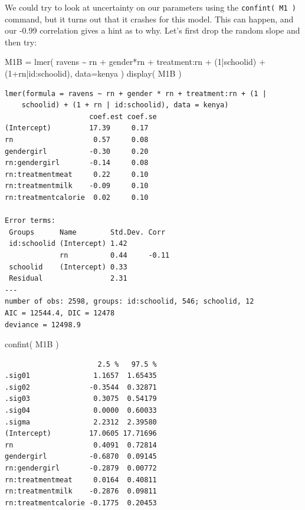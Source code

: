 \documentclass[
  letterpaper,
  DIV=11,
  numbers=noendperiod]{scrreprt}
\newenvironment{Shaded}{}{}
\newcommand{\AttributeTok}[1]{\textcolor[rgb]{0.49,0.56,0.16}{#1}}
\newcommand{\DecValTok}[1]{\textcolor[rgb]{0.25,0.63,0.44}{#1}}
\newcommand{\FunctionTok}[1]{\textcolor[rgb]{0.02,0.16,0.49}{#1}}
\newcommand{\NormalTok}[1]{#1}
\newcommand{\OtherTok}[1]{\textcolor[rgb]{0.00,0.44,0.13}{#1}}
\newcommand{\SpecialCharTok}[1]{\textcolor[rgb]{0.25,0.44,0.63}{#1}}
\begin{document}
We could try to look at uncertainty on our parameters using the
\texttt{confint(\ M1\ )} command, but it turns out that it crashes for
this model. This can happen, and our -0.99 correlation gives a hint as
to why. Let's first drop the random slope and then try:

\begin{Shaded}
\begin{Highlighting}[]
\NormalTok{M1B }\OtherTok{=} \FunctionTok{lmer}\NormalTok{( ravens }\SpecialCharTok{\textasciitilde{}}\NormalTok{ rn }\SpecialCharTok{+}\NormalTok{ gender}\SpecialCharTok{*}\NormalTok{rn }\SpecialCharTok{+}\NormalTok{ treatment}\SpecialCharTok{:}\NormalTok{rn }\SpecialCharTok{+}\NormalTok{ (}\DecValTok{1}\SpecialCharTok{|}\NormalTok{schoolid) }\SpecialCharTok{+}\NormalTok{ (}\DecValTok{1}\SpecialCharTok{+}\NormalTok{rn}\SpecialCharTok{|}\NormalTok{id}\SpecialCharTok{:}\NormalTok{schoolid), }
           \AttributeTok{data=}\NormalTok{kenya )}
\FunctionTok{display}\NormalTok{( M1B )}
\end{Highlighting}
\end{Shaded}

\begin{verbatim}
lmer(formula = ravens ~ rn + gender * rn + treatment:rn + (1 | 
    schoolid) + (1 + rn | id:schoolid), data = kenya)
                    coef.est coef.se
(Intercept)         17.39     0.17  
rn                   0.57     0.08  
gendergirl          -0.30     0.20  
rn:gendergirl       -0.14     0.08  
rn:treatmentmeat     0.22     0.10  
rn:treatmentmilk    -0.09     0.10  
rn:treatmentcalorie  0.02     0.10  

Error terms:
 Groups      Name        Std.Dev. Corr  
 id:schoolid (Intercept) 1.42           
             rn          0.44     -0.11 
 schoolid    (Intercept) 0.33           
 Residual                2.31           
---
number of obs: 2598, groups: id:schoolid, 546; schoolid, 12
AIC = 12544.4, DIC = 12478
deviance = 12498.9 
\end{verbatim}

\begin{Shaded}
\begin{Highlighting}[]
\FunctionTok{confint}\NormalTok{( M1B )}
\end{Highlighting}
\end{Shaded}

\begin{verbatim}
                      2.5 %   97.5 %
.sig01               1.1657  1.65435
.sig02              -0.3544  0.32871
.sig03               0.3075  0.54179
.sig04               0.0000  0.60033
.sigma               2.2312  2.39580
(Intercept)         17.0605 17.71696
rn                   0.4091  0.72814
gendergirl          -0.6870  0.09145
rn:gendergirl       -0.2879  0.00772
rn:treatmentmeat     0.0164  0.40811
rn:treatmentmilk    -0.2876  0.09811
rn:treatmentcalorie -0.1775  0.20453
\end{verbatim}
\end{document}
